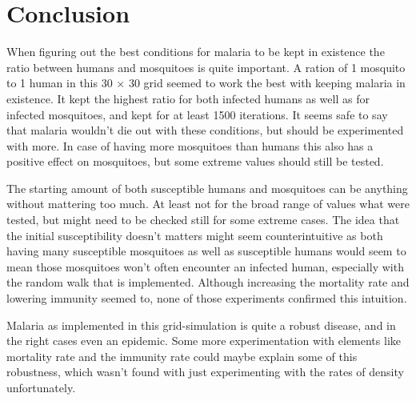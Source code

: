 \documentclass[a4paper]{report}
\begin{document}
\FloatBarrier

\section{Conclusion}
When figuring out the best conditions for malaria to be kept in existence the
ratio between humans and mosquitoes is quite important. A ration of 1 mosquito
to 1 human in this 30 $\times$ 30 grid seemed to work the best with keeping
malaria in existence. It kept the highest ratio for both infected humans as well
as for infected mosquitoes, and kept for at least 1500 iterations. It seems safe
to say that malaria wouldn't die out with these conditions, but should be
experimented with more. In case of having more mosquitoes than humans this also
has a positive effect on mosquitoes, but some extreme values should still be
tested.

The starting amount of both susceptible humans and mosquitoes can be anything
without mattering too much. At least not for the broad range of values what were
tested, but might need to be checked still for some extreme cases. The idea that
the initial susceptibility doesn't matters might seem counterintuitive as both having many susceptible mosquitoes as
well as susceptible humans would seem to mean those mosquitoes won't often
encounter an infected human, especially with the random walk that is
implemented. Although increasing the mortality rate and lowering immunity 
seemed to, none of those experiments confirmed this intuition.

Malaria as implemented in this grid-simulation is quite a robust disease, and in
the right cases even an epidemic. Some more experimentation with elements like
mortality rate and the immunity rate could maybe explain some of this robustness, which wasn't found with
just experimenting with the rates of density unfortunately.

\end{document}
